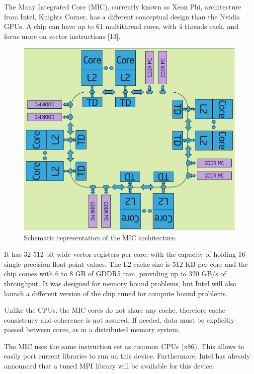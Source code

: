 The \intel Many Integrated Core (MIC), currently known as \intel Xeon Phi, architecture from Intel, Knights Corner, has a different conceptual design than the Nvidia GPUs. A chip can have up to 61 multithread cores, with 4 threads each, and focus more on vector instructions [13]. 

\begin{figure}[!htp]
	\begin{center}
		\includegraphics[scale=0.5]{../../common/img/mic_arch.png}
		\caption{Schematic representation of the \intel MIC architecture.}
		\label{fig:mic}
	\end{center}
\end{figure}

It has 32 512 bit wide vector registers per core, with the capacity of holding 16 single precision float point values. The L2 cache size is 512 KB per core and the chip comes with 6 to 8 GB of GDDR5 ram, providing up to 320 GB/s of throughput. It was designed for memory bound problems, but Intel will also launch a different version of the chip tuned for compute bound problems.

Unlike the CPUs, the MIC cores do not share any cache, therefore cache consistency and coherence is not assured. If needed, data must be explicitly passed between cores, as in a distributed memory system.

The MIC uses the same instruction set as common \intel CPUs (x86). This allows to easily port current libraries to run on this device. Furthermore, Intel has already announced that a tuned MPI library will be available for this device.

